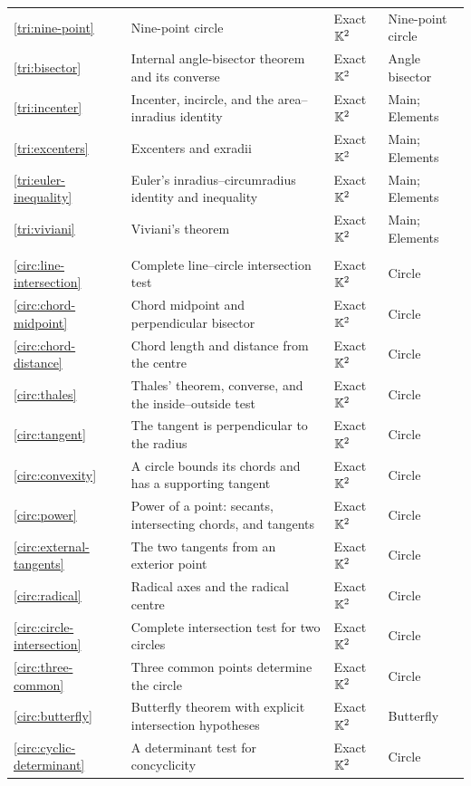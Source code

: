 {\begin{longtable}{@{}>{\raggedright\arraybackslash}p{}>{\raggedright\arraybackslash}p{}>{\raggedright\arraybackslash}p{}>{\raggedright\arraybackslash}p{}@{}}
\ref{tri:nine-point} & Nine-point circle & Exact $\mathbb K^2$ & Nine-point circle\\
\ref{tri:bisector} & Internal angle-bisector theorem and its converse & Exact $\mathbb K^2$ & Angle bisector\\
\ref{tri:incenter} & Incenter, incircle, and the area--inradius identity & Exact $\mathbb K^2$ & Main; Elements\\
\ref{tri:excenters} & Excenters and exradii & Exact $\mathbb K^2$ & Main; Elements\\
\ref{tri:euler-inequality} & Euler's inradius--circumradius identity and inequality & Exact $\mathbb K^2$ & Main; Elements\\
\ref{tri:viviani} & Viviani's theorem & Exact $\mathbb K^2$ & Main; Elements\\
\multicolumn{4}{@{}l}{\textbf{Circles and constructions} (26 declarations)}\\*[2pt]
\ref{circ:line-intersection} & Complete line--circle intersection test & Exact $\mathbb K^2$ & Circle\\
\ref{circ:chord-midpoint} & Chord midpoint and perpendicular bisector & Exact $\mathbb K^2$ & Circle\\
\ref{circ:chord-distance} & Chord length and distance from the centre & Exact $\mathbb K^2$ & Circle\\
\ref{circ:thales} & Thales' theorem, converse, and the inside--outside test & Exact $\mathbb K^2$ & Circle\\
\ref{circ:tangent} & The tangent is perpendicular to the radius & Exact $\mathbb K^2$ & Circle\\
\ref{circ:convexity} & A circle bounds its chords and has a supporting tangent & Exact $\mathbb K^2$ & Circle\\
\ref{circ:power} & Power of a point: secants, intersecting chords, and tangents & Exact $\mathbb K^2$ & Circle\\
\ref{circ:external-tangents} & The two tangents from an exterior point & Exact $\mathbb K^2$ & Circle\\
\ref{circ:radical} & Radical axes and the radical centre & Exact $\mathbb K^2$ & Circle\\
\ref{circ:circle-intersection} & Complete intersection test for two circles & Exact $\mathbb K^2$ & Circle\\
\ref{circ:three-common} & Three common points determine the circle & Exact $\mathbb K^2$ & Circle\\
\ref{circ:butterfly} & Butterfly theorem with explicit intersection hypotheses & Exact $\mathbb K^2$ & Butterfly\\
\ref{circ:cyclic-determinant} & A determinant test for concyclicity & Exact $\mathbb K^2$ & Circle\\

\end{longtable}}

